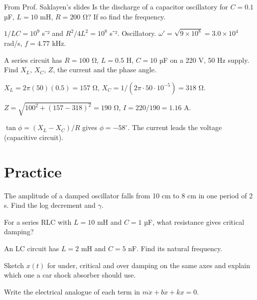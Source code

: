  
\begin{example}[Example 2]
From Prof. Saklayen’s slides
Is the discharge of a capacitor oscillatory for $C=0.1$ µF, $L=10$ mH, $R=200$ Ω? If so find the frequency.
\begin{solution}
$1/LC=10^9$ s⁻² and $R^2/4L^2=10^8$ s⁻². Oscillatory. $\omega'=\sqrt{9\times10^8}=3.0\times10^4$ rad/s, $f=4.77$ kHz.
\end{solution}
\end{example}

 
\begin{example}[Example 3]
A series circuit has $R=100$ Ω, $L=0.5$ H, $C=10$ µF on a 220 V, 50 Hz supply. Find $X_L$, $X_C$, $Z$, the current and the phase angle.
\begin{solution}
$X_L=2\pi(50)(0.5)=157$ Ω, $X_C=1/(2\pi\cdot50\cdot10^{-5})=318$ Ω.

$Z=\sqrt{100^2+(157-318)^2}=190$ Ω, $I=220/190=1.16$ A.

$\tan\phi=(X_L-X_C)/R$ gives $\phi=-58^\circ$. The current leads the voltage (capacitive circuit).
\end{solution}
\end{example}

 
\section{Practice}

 
\begin{problems}
\item The amplitude of a damped oscillator falls from 10 cm to 8 cm in one period of 2 s. Find the log decrement and $\gamma$. 
\item For a series RLC with $L=10$ mH and $C=1$ µF, what resistance gives critical damping? 
\item An LC circuit has $L=2$ mH and $C=5$ nF. Find its natural frequency. 
\item Sketch $x(t)$ for under, critical and over damping on the same axes and explain which one a car shock absorber should use.
\item Write the electrical analogue of each term in $m\ddot x+b\dot x+kx=0$.
\end{problems}

